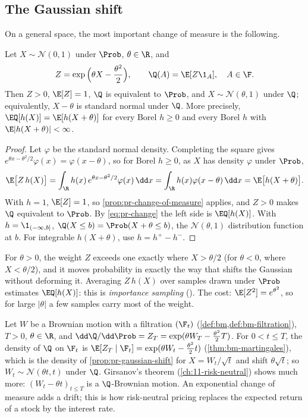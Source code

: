\subsection{The Gaussian shift}

On a general space, the most important change of measure is the following.

\begin{proposition}\label{prop:pr-gaussian-shift}
Let $X\sim\mathcal N(0,1)$ under $\Prob$, $\theta\in\R$, and
\[
  Z=\exp\Big(\theta X-\frac{\theta^2}{2}\Big),\qquad \Q(A)=\E[Z\1_A],\quad A\in\F .
\]
Then $Z>0$, $\E[Z]=1$, $\Q$ is equivalent to $\Prob$, and $X\sim\mathcal N(\theta,1)$ under
$\Q$; equivalently, $X-\theta$ is standard normal under $\Q$. More precisely,
$\EQ[h(X)]=\E[h(X+\theta)]$ for every Borel $h\ge0$ and every Borel $h$ with
$\E|h(X+\theta)|<\infty$.
\end{proposition}

\begin{proof}
Let $\varphi$ be the standard normal density. Completing the square gives
$e^{\theta x-\theta^2/2}\varphi(x)=\varphi(x-\theta)$, so for Borel $h\ge0$, as $X$ has
density $\varphi$ under $\Prob$,
\[
  \E\big[Z\,h(X)\big]=\int_\R h(x)\,e^{\theta x-\theta^2/2}\varphi(x)\,\dd x
  =\int_\R h(x)\varphi(x-\theta)\,\dd x=\E\big[h(X+\theta)\big].
\]
With $h=1$, $\E[Z]=1$, so \cref{prop:pr-change-of-measure} applies, and $Z>0$ makes $\Q$
equivalent to $\Prob$. By \eqref{eq:pr-change} the left side is $\EQ[h(X)]$. With
$h=\1_{(-\infty,b]}$, $\Q(X\le b)=\Prob(X+\theta\le b)$, the $\mathcal N(\theta,1)$
distribution function at $b$. For integrable $h(X+\theta)$, use $h=h^+-h^-$.
\end{proof}

For $\theta>0$, the weight $Z$ exceeds one exactly where $X>\theta/2$ (for $\theta<0$, where
$X<\theta/2$), and it moves probability in exactly the way that shifts the Gaussian without deforming it. Averaging $Z\,h(X)$ over samples drawn
under $\Prob$ estimates $\EQ[h(X)]$: this is \emph{importance sampling}
(). The cost: $\E[Z^2]=e^{\theta^2}$, so for large $|\theta|$ a few
samples carry most of the weight.

\begin{remark}\label{rem:pr-girsanov}
Let $W$ be a Brownian motion with a filtration $(\F_t)$ (\cref{def:bm,def:bm-filtration}),
$T>0$,
$\theta\in\R$, and $\dd\Q/\dd\Prob=Z_T=\exp(\theta W_T-\frac{\theta^2}2T)$. For
$0<t\le T$, the density of $\Q$ on $\F_t$ is $\E[Z_T\mid\F_t]=\exp(\theta
W_t-\frac{\theta^2}2t)$ (\cref{thm:bm-martingales}), which is the density of
\cref{prop:pr-gaussian-shift} for $X=W_t/\sqrt t$ and shift $\theta\sqrt t$; so
$W_t\sim\mathcal N(\theta t,t)$ under $\Q$. Girsanov's theorem (\cref{ch:11-risk-neutral})
shows much more: $(W_t-\theta t)_{t\le T}$ is a $\Q$-Brownian motion. An exponential change
of measure adds a drift; this is how risk-neutral pricing replaces the expected return of a
stock by the interest rate.
\end{remark}

